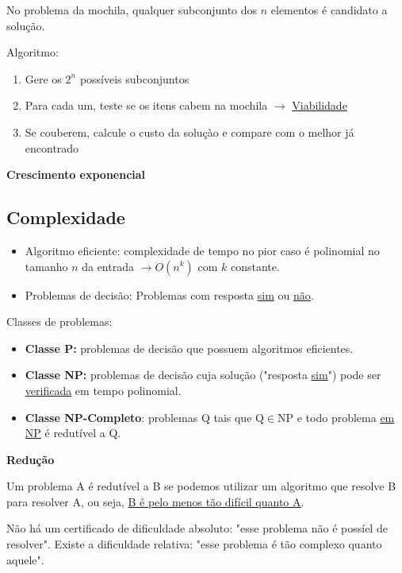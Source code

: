 \begin{example}
    No problema da mochila, qualquer subconjunto dos $n$ elementos é candidato a solução.

    \vspace{\baselineskip}
    Algoritmo:
    \begin{enumerate}
        \item Gere os $2^{n}$ possíveis subconjuntos
        \item Para cada um, teste se os itens cabem na mochila $\to$ \underline{Viabilidade}
        \item Se couberem, calcule o custo da soluçào e compare com o melhor já encontrado
    \end{enumerate}

    \textbf{Crescimento exponencial}
\end{example}

\subsection{Complexidade}

\begin{itemize}
    \item Algoritmo eficiente: complexidade de tempo no pior caso é polinomial no tamanho $n$ da entrada $\to O(n^{k})$ com $k$ constante.
    \item Problemas de decisão: Problemas com resposta \underline{sim} ou \underline{não}.
\end{itemize}

Classes de problemas:

\begin{itemize}
    \item \textbf{Classe P:} problemas de decisão que possuem algoritmos eficientes.
    \item \textbf{Classe NP:} problemas de decisão cuja solução ("resposta \underline{sim}") pode ser \underline{verificada} em tempo polinomial.
    \item \textbf{Classe NP-Completo}: problemas Q tais que $\mathrm{Q} \in \mathrm{NP}$ e todo problema \underline{em NP} é redutível a Q.
\end{itemize}

\textbf{Redução}

Um problema A é redutível a B se podemos utilizar um algoritmo que resolve B para resolver A, ou seja, \underline{B é pelo menos tão difícil quanto A}.

Não há um certificado de dificuldade absoluto: "esse problema não é possíel de resolver". Existe a dificuldade relativa: "esse problema é tão complexo quanto aquele".

